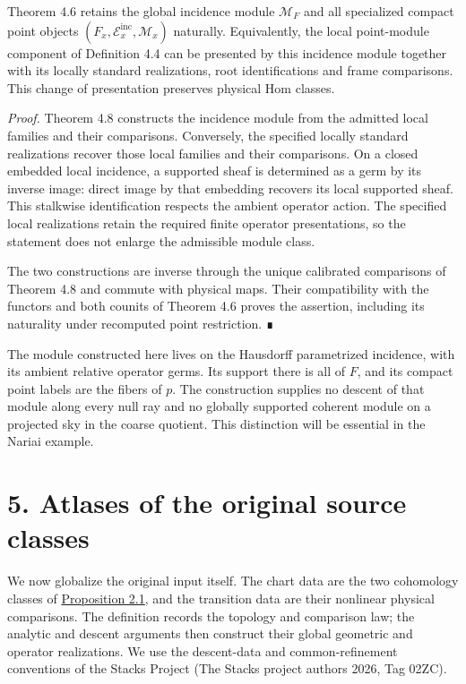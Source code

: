 \documentclass[
  english,
  11pt,
  reqno]{amsart}
\begin{document}
Theorem 4.6 retains the global incidence module \(\mathscr M_F\) and all
specialized compact point objects
\((F_x,\mathscr E_x^{\mathrm{inc}},\mathscr M_x)\) naturally.
Equivalently, the local point-module component of Definition 4.4 can be
presented by this incidence module together with its locally standard
realizations, root identifications and frame comparisons. This change of
presentation preserves physical Hom classes.

\emph{Proof.} Theorem 4.8 constructs the incidence module from the
admitted local families and their comparisons. Conversely, the specified
locally standard realizations recover those local families and their
comparisons. On a closed embedded local incidence, a supported sheaf is
determined as a germ by its inverse image: direct image by that
embedding recovers its local supported sheaf. This stalkwise
identification respects the ambient operator action. The specified local
realizations retain the required finite operator presentations, so the
statement does not enlarge the admissible module class.

The two constructions are inverse through the unique calibrated
comparisons of Theorem 4.8 and commute with physical maps. Their
compatibility with the functors and both counits of Theorem 4.6 proves
the assertion, including its naturality under recomputed point
restriction. ∎

The module constructed here lives on the Hausdorff parametrized
incidence, with its ambient relative operator germs. Its support there
is all of \(F\), and its compact point labels are the fibers of \(p\).
The construction supplies no descent of that module along every null ray
and no globally supported coherent module on a projected sky in the
coarse quotient. This distinction will be essential in the Nariai
example.

\protect{}\label{sec:original-source-atlases-v08}

\section{5. Atlases of the original source
classes}\label{atlases-of-the-original-source-classes}

We now globalize the original input itself. The chart data are the two
cohomology classes of
\hyperref[prop:original-two-class-local-input]{Proposition 2.1}, and the
transition data are their nonlinear physical comparisons. The definition
records the topology and comparison law; the analytic and descent
arguments then construct their global geometric and operator
realizations. We use the descent-data and common-refinement conventions
of the Stacks Project (The Stacks project authors 2026, Tag 02ZC).
\end{document}
